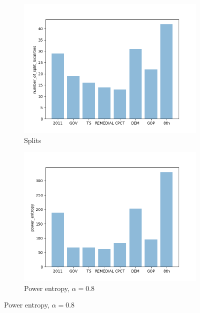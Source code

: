 \documentclass{mgggarticle}
\begin{document}
\begin{figure}
\begin{subfigure}{0.4\textwidth}
\centering
\includegraphics[width=\textwidth]{bars/number_of_split_localities_bar.png}
\caption{Splits}
\end{subfigure}
\begin{subfigure}{0.4\textwidth}
\centering
\includegraphics[width=\textwidth]{bars/power_entropy_bar.png}
\caption{Power entropy, $\alpha = 0.8$}
\end{subfigure}


\end{figure}
\end{document}
